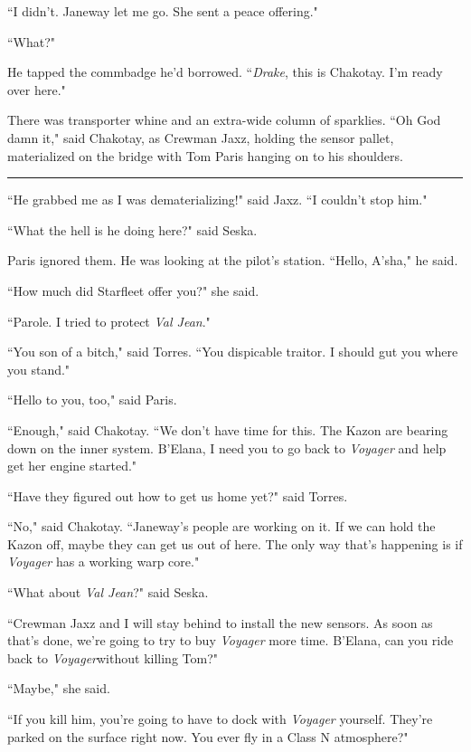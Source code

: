 \documentclass[twoside,letterpaper,12pt]{memoir}
\begin{document}
``I didn't. Janeway let me go. She sent a peace offering."

``What?"

He tapped the commbadge he'd borrowed. ``\textit{Drake}, this is Chakotay. I'm ready over here."

There was transporter whine and an extra-wide column of sparklies. ``Oh God damn it," said Chakotay, as Crewman Jaxz, holding the sensor pallet, materialized on the bridge with Tom Paris hanging on to his shoulders.

\begin{center}\rule{3cm}{0.4 pt}\end{center}

``He grabbed me as I was dematerializing!" said Jaxz. ``I couldn't stop him."

``What the hell is he doing here?" said Seska.

Paris ignored them. He was looking at the pilot’s station. ``Hello, A'sha," he said.

``How much did Starfleet offer you?" she said.

``Parole. I tried to protect \textit{Val Jean}."

``You son of a bitch," said Torres. ``You dispicable traitor. I should gut you where you stand."

``Hello to you, too," said Paris.

``Enough," said Chakotay. ``We don't have time for this. The Kazon are bearing down on the inner system. B'Elana, I need you to go back to \textit{Voyager} and help get her engine started."

``Have they figured out how to get us home yet?" said Torres.

``No," said Chakotay. ``Janeway's people are working on it. If we can hold the Kazon off, maybe they can get us out of here. The only way that's happening is if \textit{Voyager} has a working warp core."

``What about \textit{Val Jean}?" said Seska.

``Crewman Jaxz and I will stay behind to install the new sensors. As soon as that's done, we're going to try to buy \textit{Voyager} more time. B'Elana, can you ride back to \textit{Voyager}without killing Tom?"

``Maybe," she said.

``If you kill him, you're going to have to dock with \textit{Voyager} yourself. They're parked on the surface right now. You ever fly in a Class N atmosphere?"
\end{document}
